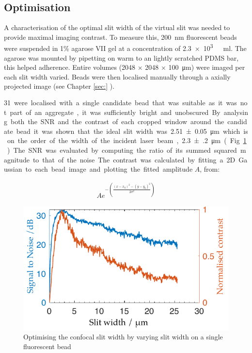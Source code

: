 \subsection{Optimisation}

A characterisation of the optimal slit width of the virtual slit was needed to provide maximal imaging contrast.
To measure this, \SI{200}{\nano\metre} fluorescent beads were suspended in 1\% agarose VII gel at a concentration of \SI{2.3e3}{ \per\milli\litre}.
The agarose was mounted by pipetting on warm to an lightly scratched PDMS bar, this helped adherence.
Entire volumes (2048 $\times$ 2048 $\times$ \SI{100}{\micro\metre}) were imaged per each slit width varied.
Beads were then localised manually through a axially projected image (see Chapter \ref{sec:} %
).

\SI{31} were localised with a single candidate bead that was suitable as it was not part of an aggregate, it was sufficiently bright and unobscured.
By analysing both the SNR and the contrast of each cropped window around the candidate bead it was shown that the ideal slit width was \SI{2.51(5)}{\micro\metre} which is on the order of the width of the incident laser beam, \SI{2.3(2)}{\micro\metre} (Fig. \ref{fig:optimal_slit_snr_contrast}).
The SNR was evaluated by computing the ratio of its summed squared magnitude to that of the noise.
The contrast was calculated by fitting a 2D Gaussian to each bead image and plotting the fitted amplitude $A$, from:

\begin{align}
  A e^{-\left(\frac{(x-x_0)^2-(y-y_0)^2}{2\sigma^2}\right)}
\end{align}

\begin{figure}
  \centering
  \includegraphics{Chapters/dualslit/Figs/PDF/optimal_slit_snr_contrast}
  \caption{Optimising the confocal slit width by varying slit width on a single fluorescent bead}
  \label{fig:optimal_slit_snr_contrast}
\end{figure}


